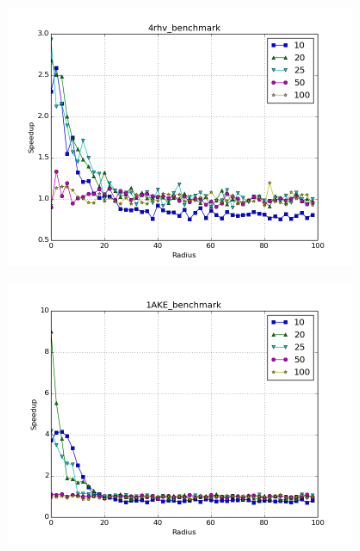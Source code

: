 \documentclass[review,preprint,12pt]{elsarticle}
\theoremstyle{definition}
\theoremstyle{remark}
\numberwithin{equation}{section}
\begin{document}
\begin{figure}[tbp]
    \centering
    \begin{subfigure}[b]{0.49\textwidth}
        \includegraphics[width=1\textwidth]{assets/4rhv_benchmark_euclid}
        \caption{}
    \end{subfigure}%
    \begin{subfigure}[b]{0.49\textwidth}
        \includegraphics[width=1\textwidth]{assets/1AKE_benchmark_euclid}
        \caption{}
    \end{subfigure}
    \begin{subfigure}[b]{0.49\textwidth}

\end{subfigure}
\end{figure}
\end{document}
